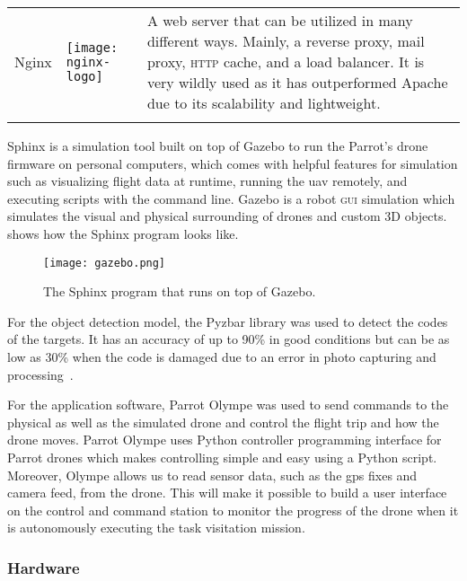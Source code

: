 \documentclass[../main.tex]{subfiles}
\begin{document}
\begin{table}[p]
\begin{tabular}{ p{3cm} p{3cm} p{6cm} }
				\\ 
				\addlinespace				
		Nginx
		& 
		\raisebox{-0.9\height}
		{\texttt{[image: nginx-logo]}}
		& A web server that can be utilized in many different ways. Mainly, a 
		reverse proxy, mail proxy, \textsc{http} cache, and a load balancer. 
		It is very wildly used as it has outperformed Apache due to its 
		scalability and lightweight.
		\\ 
		\addlinespace
		
        \bottomrule
    \end{tabular}
\end{table}

Sphinx is a simulation 
tool built on top of Gazebo 
to run the Parrot's drone firmware on 
personal computers, which comes with helpful 
features for simulation such as visualizing flight 
data at runtime, running the \gls{uav} remotely, 
and executing scripts with the command line. 
Gazebo is a robot \textsc{gui} simulation 
which simulates the visual and physical surrounding 
of drones and custom 3D objects. 
 shows how the Sphinx 
program looks like. 

\begin{figure}[tbp]
    \centering
    \texttt{[image: gazebo.png]}
    \caption{The Sphinx program that runs on top of Gazebo.}
    \label{fig:gazebo}
\end{figure}

For the object detection model, the Pyzbar library was used to detect
the \qr codes of the targets.
It has an accuracy of up to 90\% in good conditions but can be as
low as 30\% when the \qr code is damaged due to an error in photo
capturing and processing~\cite{dynamsoft}.

For the application software, Parrot Olympe 
was used to send commands to the physical as well as 
the simulated drone and control the flight trip and 
how the drone moves. Parrot Olympe uses Python 
controller programming interface for Parrot drones 
which makes controlling simple and easy using a 
Python script. Moreover, Olympe allows us to read
sensor data, such as the \gls{gps} fixes and camera feed, 
from the \anafi
drone. This will make it possible to build a user interface
on the control and command station to monitor 
the progress of the drone
when it is autonomously executing the task visitation
mission.



\subsubsection{Hardware}
\end{document}
